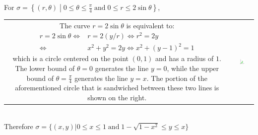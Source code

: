\documentclass{article}
\newcommand{\dr}[1]{\textcolor{dark_red}{#1}}
\begin{document}
\dr{\begin{framed}
For \(\sigma = \left\{(r,\theta) \middle| 0 \leq \theta \leq \frac{\pi}{4} \;\text{and}\; 0 \leq r \leq 2\sin\theta\right\}\), \\
\begin{tabular}{cc}
\parbox{0.6\textwidth}{
The curve \(r = 2\sin\theta\) is equivalent to:
\begin{align*}
r = 2\sin\theta \iff & r = 2(y/r) 
\iff r^2 = 2y \\
\iff & x^2 + y^2 = 2y 
\iff x^2 + (y - 1)^2 = 1
\end{align*}
which is a circle centered on the point \((0,1)\) and has a radius of \(1\). The lower bound of \(\theta = 0\) generates the line \(y = 0\), while the upper bound of \(\theta = \frac{\pi}{4}\) generates the line \(y = x\). The portion of the aforementioned circle that is sandwiched between these two lines is shown on the right. 
} & \parbox{0.4\textwidth}{
\includegraphics[width = 0.3\textwidth]{Test_bench_part_3x_images/Test_bench_part_3x_Solutions_image_9}
}
\end{tabular} \\
Therefore \(\sigma = \{(x,y) | 0 \leq x \leq 1 \;\text{and}\; 1 - \sqrt{1 - x^2} \leq y \leq x\}\)
\end{framed}}

\pagebreak
\end{document}
